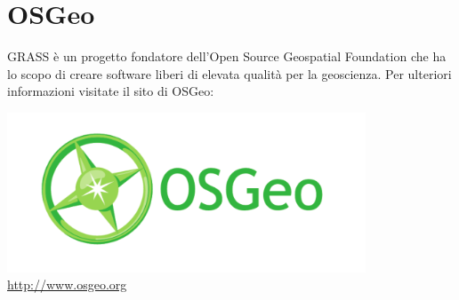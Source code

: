 \documentclass[notumble,a4paper,10pt,nofoldmark]{leaflet}
\begin{document}
\vfill
\section{OSGeo}

GRASS \`e un progetto fondatore dell'Open Source Geospatial Foundation che ha lo scopo di creare software liberi di elevata qualit\`a per la geoscienza. Per ulteriori informazioni visitate il sito di OSGeo:
\begin{center}
\includegraphics[width=0.8\textwidth]{OSGeo_CMYK}\\
\url{http://www.osgeo.org}
\end{center}
\end{document}
